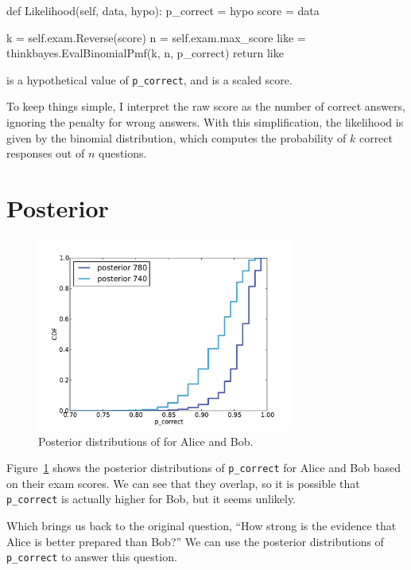 \documentclass[12pt]{book}
\theoremstyle{exercise}
\begin{document}
\begin{code}
    def Likelihood(self, data, hypo):
        p_correct = hypo
        score = data

        k = self.exam.Reverse(score)
        n = self.exam.max_score
        like = thinkbayes.EvalBinomialPmf(k, n, p_correct)
        return like
\end{code}

 is a hypothetical
value of \verb"p_correct", and  is a scaled score.

To keep things simple, I interpret the raw score as the number of
correct answers, ignoring the penalty for wrong answers.  With
this simplification, the likelihood is given by the binomial
distribution, which computes the probability of $k$ correct
responses out of $n$ questions.


\section{Posterior}

\begin{figure}
\centerline{\includegraphics[height=2.5in]{figs/sat_posteriors_p_corr.pdf}}
\caption{Posterior distributions of  for Alice and Bob.}
\label{fig.satposterior1}
\end{figure}

Figure~\ref{fig.satposterior1} shows the posterior distributions
of \verb"p_correct" for Alice and Bob based on their exam scores.
We can see that they overlap, so it is possible that \verb"p_correct"
is actually higher for Bob, but it seems unlikely.

Which brings us back to the original question, ``How strong is the
evidence that Alice is better prepared than Bob?''  We can use the
posterior distributions of \verb"p_correct" to answer this question.
\end{document}
